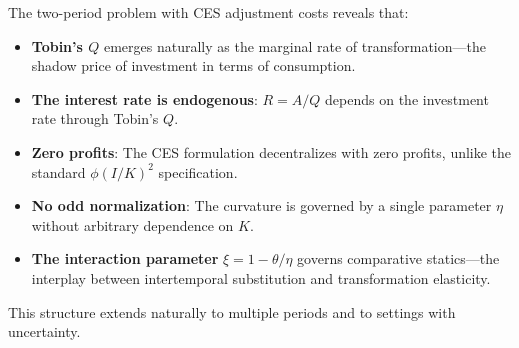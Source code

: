 \begin{callouttip}
The two-period problem with CES adjustment costs reveals that:
\begin{itemize}[nosep]
\item \textbf{Tobin's $Q$} emerges naturally as the marginal rate of transformation---the shadow price of investment in terms of consumption.
\item \textbf{The interest rate is endogenous}: $R = A/Q$ depends on the investment rate through Tobin's $Q$.
\item \textbf{Zero profits}: The CES formulation decentralizes with zero profits, unlike the standard $\phi(I/K)^2$ specification.
\item \textbf{No odd normalization}: The curvature is governed by a single parameter $\eta$ without arbitrary dependence on $K$.
\item \textbf{The interaction parameter} $\xi = 1 - \theta/\eta$ governs comparative statics---the interplay between intertemporal substitution and transformation elasticity.
\end{itemize}
This structure extends naturally to multiple periods and to settings with uncertainty.
\end{callouttip}
